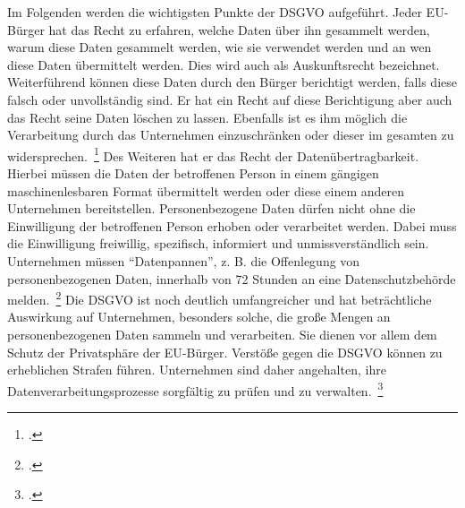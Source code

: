 Im Folgenden werden die wichtigsten Punkte der \ac{DSGVO} aufgeführt. Jeder \ac{EU}-Bürger hat das Recht zu erfahren, welche Daten über ihn gesammelt werden, warum diese Daten gesammelt werden, wie sie verwendet werden und an wen diese Daten übermittelt werden. 
Dies wird auch als Auskunftsrecht bezeichnet. Weiterführend können diese Daten durch den Bürger
berichtigt werden, falls diese falsch oder unvollständig sind. Er hat ein Recht auf diese Berichtigung aber auch das Recht seine Daten löschen zu lassen. Ebenfalls ist es ihm möglich die 
Verarbeitung durch das Unternehmen einzuschränken oder dieser im gesamten zu widersprechen.~\footcite[\vglf][]{Voigt.2018} Des Weiteren hat er das Recht der Datenübertragbarkeit. Hierbei müssen die Daten der
betroffenen Person in einem gängigen maschinenlesbaren Format übermittelt werden oder diese einem anderen Unternehmen bereitstellen.
Personenbezogene Daten dürfen nicht ohne die Einwilligung der betroffenen Person erhoben oder verarbeitet werden. Dabei muss die Einwilligung freiwillig, spezifisch, informiert und
unmissverständlich sein.
Unternehmen müssen \enquote{Datenpannen}, z. B. die Offenlegung von personenbezogenen Daten, innerhalb von 72 Stunden an eine Datenschutzbehörde melden.~\footcite[\vglf][]{Voigt.2018}
Die \ac{DSGVO} ist noch deutlich umfangreicher und hat beträchtliche Auswirkung auf Unternehmen, besonders solche, die große Mengen an personenbezogenen Daten sammeln und verarbeiten.
Sie dienen vor allem dem Schutz der Privatsphäre der \ac{EU}-Bürger.
Verstöße gegen die DSGVO können zu erheblichen Strafen führen. Unternehmen sind daher angehalten, ihre Datenverarbeitungsprozesse sorgfältig zu prüfen und zu verwalten.~\footcite[\vglf][]{Voigt.2018}

